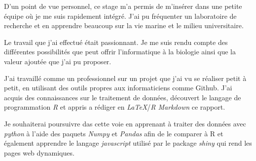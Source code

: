 \documentclass[]{article}
\begin{document}
D'un point de vue personnel, ce stage m'a permis de m'insérer dans une
petite équipe où je me suis rapidement intégré. J'ai pu fréquenter un
laboratoire de recherche et en apprendre beaucoup sur la vie marine et
le milieu universitaire.

Le travail que j'ai effectué était passionnant. Je me suis rendu compte
des différentes possibilités que peut offrir l'informatique à la
biologie ainsi que la valeur ajoutée que j'ai pu proposer.

J'ai travaillé comme un professionnel sur un projet que j'ai vu se
réaliser petit à petit, en utilisant des outils propres aux
informaticiens comme Github. J'ai acquis des connaissances sur le
traitement de données, découvert le langage de programmation \emph{R} et
appris a rédiger en \emph{LaTeX}/\emph{R Markdown} ce rapport.

Je souhaiterai poursuivre das cette voie en apprenant à traiter des
données avec \emph{python} à l'aide des paquets \emph{Numpy} et
\emph{Pandas} afin de le comparer à R et également apprendre le langage
\emph{javascript} utilisé par le package \emph{shiny} qui rend les pages
web dynamiques.
\end{document}
